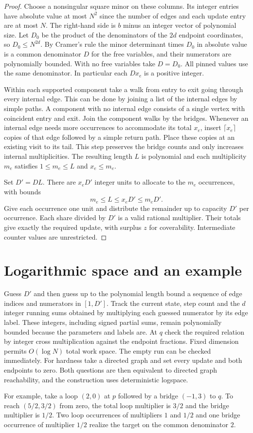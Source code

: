 \documentclass[a4paper,11pt]{amsart}
\begin{document}
\begin{proof}
Choose a nonsingular square minor on these columns. Its integer entries have absolute value at most $N^2$ since the number of edges and each update entry are at most $N$. The right-hand side is $b$ minus an integer vector of polynomial size. Let $D_0$ be the product of the denominators of the $2d$ endpoint coordinates, so $D_0\le N^{2d}$. By Cramer's rule the minor determinant times $D_0$ in absolute value is a common denominator $D$ for the free variables, and their numerators are polynomially bounded. With no free variables take $D=D_0$. All pinned values use the same denominator. In particular each $Dx_e$ is a positive integer.

Within each supported component take a walk from entry to exit going through every internal edge. This can be done by joining a list of the internal edges by simple paths. A component with no internal edge consists of a single vertex with coincident entry and exit. Join the component walks by the bridges. Whenever an internal edge needs more occurrences to accommodate its total $x_e$, insert $\lceil x_e\rceil$ copies of that edge followed by a simple return path. Place these copies at an existing visit to its tail. This step preserves the bridge counts and only increases internal multiplicities. The resulting length $L$ is polynomial and each multiplicity $m_e$ satisfies $1\le m_e\le L$ and $x_e\le m_e$.

Set $D'=DL$. There are $x_eD'$ integer units to allocate to the $m_e$ occurrences, with bounds
\[
 m_e\le L\le x_eD'\le m_eD'.
\]
Give each occurrence one unit and distribute the remainder up to capacity $D'$ per occurrence. Each share divided by $D'$ is a valid rational multiplier. Their totals give exactly the required update, with surplus $z$ for coverability. Intermediate counter values are unrestricted.
\end{proof}
\section{Logarithmic space and an example}
Guess $D'$ and then guess up to the polynomial length bound a sequence of edge indices and numerators in $[1,D']$. Track the current state, step count and the $d$ integer running sums obtained by multiplying each guessed numerator by its edge label. These integers, including signed partial sums, remain polynomially bounded because the parameters and labels are. At $q$ check the required relation by integer cross multiplication against the endpoint fractions. Fixed dimension permits $O(\log N)$ total work space. The empty run can be checked immediately. For hardness take a directed graph and set every update and both endpoints to zero. Both questions are then equivalent to directed graph reachability, and the construction uses deterministic logspace.

For example, take a loop $(2,0)$ at $p$ followed by a bridge $(-1,3)$ to $q$. To reach $(5/2,3/2)$ from zero, the total loop multiplier is $3/2$ and the bridge multiplier is $1/2$. Two loop occurrences of multipliers $1$ and $1/2$ and one bridge occurrence of multiplier $1/2$ realize the target on the common denominator $2$.


\end{document}
